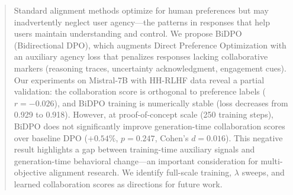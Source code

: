 \begin{abstract}
Standard alignment methods optimize for human preferences but may inadvertently neglect user agency---the patterns in responses that help users maintain understanding and control. We propose BiDPO (Bidirectional DPO), which augments Direct Preference Optimization with an auxiliary agency loss that penalizes responses lacking collaborative markers (reasoning traces, uncertainty acknowledgment, engagement cues). Our experiments on Mistral-7B with HH-RLHF data reveal a partial validation: the collaboration score is orthogonal to preference labels ($r = -0.026$), and BiDPO training is numerically stable (loss decreases from 0.929 to 0.918). However, at proof-of-concept scale (250 training steps), BiDPO does not significantly improve generation-time collaboration scores over baseline DPO ($+0.54\%$, $p = 0.247$, Cohen's $d = 0.016$). This negative result highlights a gap between training-time auxiliary signals and generation-time behavioral change---an important consideration for multi-objective alignment research. We identify full-scale training, $\lambda$ sweeps, and learned collaboration scores as directions for future work.
\end{abstract}
